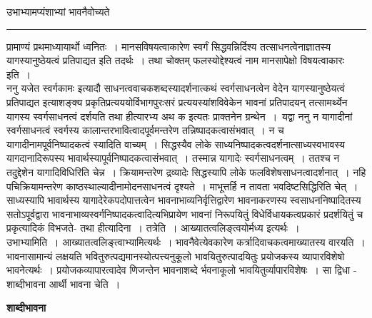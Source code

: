 \documentclass[11pt, openany]{book}
\begin{document}
{\bl उभाभ्यामप्यंशाभ्यां भावनैवोच्यते  }\\
\hrule
\vspace{3mm}
\noindent
प्रामाण्यं प्रथमाध्यायार्थो ध्वनितः~। मानसविषयत्वाकारेण स्वर्गं सिद्धवन्निर्दिश्य तत्साधनत्वेनाज्ञातस्य यागस्यानुष्ठेयत्वं प्रतिपाद्यत इति तदर्थः~। तथा चोक्तम् {\qt फलस्योद्देश्यत्वं नाम मानसापेक्षो विषयत्वाकारः} इति~।\\

 {\br ननु} {\qt यजेत स्वर्गकामः} इत्यादौ साधनत्ववाचकशब्दस्यादर्शनात्कथं स्वर्गसाधनत्वेन वेदेन यागस्यानुष्ठेयत्वं प्रतिपाद्यत इत्याशङ्क्य प्रकृतिप्रत्यययोर्विभागपुरःसरं प्रत्ययस्यांशविवेकेन भावनां प्रतिपादयन् तत्सामर्थ्येन यागस्य स्वर्गसाधनत्वं दर्शयति {\br तथा ही}त्यारभ्य {\br अथ क} इत्यतः प्राक्तनेन ग्रन्थेन~।~यद्वा {\br ननु} न यागादीनां स्वर्गसाधनत्वं स्वर्गस्य कालान्तरभावित्वादपूर्वमन्तरेण तन्निष्पादकत्वासंभवात्~। न च यागादीनामपूर्वनिष्पादकत्वं स्यादिति वाच्यम्~। सिद्धस्यैव लोके
साध्यनिष्पादकत्वदर्शनात्साध्यस्वभावस्य यागदानादिरूपस्य भावार्थस्यापूर्वनिष्पादकत्वासंभवात्~। तस्मान्न यागादेः स्वर्गसाधनत्वम्~। ततश्च न तदुद्देशेन यागादिविधिरिति चेन्न~। क्रियामन्तरेण द्रव्यादेः सिद्धस्यापि लोके फलविशेषसाधनत्वादर्शनात्~। नहि पचिक्रियामन्तरेण काष्ठस्थाल्यादीनामोदनसाधनत्वं दृश्यते~। माभूत्तर्हि न तावता
भवदिष्टसिद्धिरिति चेत्~। साध्यस्यापि भावार्थस्य यागादेरेकपदोपात्तत्वेन भावनाभाव्यनिर्वृत्तिद्वारेण भावनाकरणस्य स्वसाधननिष्पादितस्य सतोऽपूर्वद्वारा भावनाभाव्यस्वर्गनिष्पादकत्वादित्यभिप्रायेण भावनां निरूपयितुं विधेर्विधायकत्वप्रकारं प्रदर्शयितुं च प्रकृत्यादिकं विभजते- {\br तथा हीत्यादिना}~। {\br तत्रेति~।} आख्यातत्वलिङ्त्वयोर्मध्य इत्यर्थः~।\\

 {\br उभाभ्यामिति~।} आख्यातत्वलिङ्त्वाभ्यामित्यर्थः~। भावनैवेत्येवकारेण कर्त्रादिवाचकत्वमाख्यातस्य वारयति~। भावनासामान्यं लक्षयति भवितुरुत्पद्यमानस्योत्पत्त्यनुकूलो भावयितुरुत्पादयितुः प्रयोजकस्य व्यापारविशेषो भावनेत्यर्थः~। प्रयोजकव्यापारत्वादेव णिजन्तेन {\qt भावना}शब्दे
\newpage
\fancyhead[LO]{[ शाब्दी भावना ]}
{\bl\noindent 
{\al र्भवनाकूलो भावयितुर्व्यापारविशेषः}~। सा द्विधा - शाब्दीभावना आर्थी भावना चेति~।}
\begin{center}
 \textbf{शाब्दीभावना   }
\end{center}
 
\end{document}

